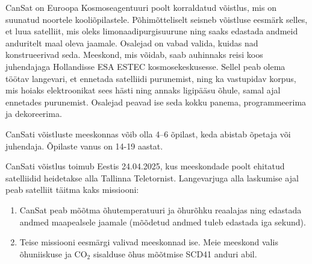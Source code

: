 CanSat on Euroopa Kosmoseagentuuri poolt korraldatud võistlus, mis on suunatud noortele kooliõpilastele. Põhimõtteliselt seisneb võistluse eesmärk selles, et luua satelliit, mis oleks limonaadipurgisuurune ning saaks edastada andmeid anduritelt maal oleva jaamale. Osalejad on vabad valida, kuidas nad konstrueerivad seda. Meeskond, mis võidab, saab auhinnaks reisi koos juhendajaga Hollandisse ESA ESTEC kosmosekeskusesse. Sellel peab olema töötav langevari, et ennetada satelliidi purunemist, ning ka vastupidav korpus, mis hoiaks elektroonikat sees hästi ning annaks ligipääsu õhule, samal ajal ennetades purunemist. Osalejad peavad ise seda kokku panema, programmeerima ja dekoreerima.

CanSati võistluste meeskonnas võib olla 4–6 õpilast, keda abistab õpetaja või juhendaja. Õpilaste vanus on 14-19 aastat.

CanSati võistlus toimub Eestis 24.04.2025, kus meeskondade poolt ehitatud satelliidid heidetakse alla Tallinna Teletornist. Langevarjuga alla laskumise ajal peab satelliit täitma kaks missiooni:
\begin{enumerate}
    \item CanSat peab mõõtma õhutemperatuuri ja õhurõhku reaalajas ning edastada andmed maapealsele jaamale (mõõdetud andmed tuleb edastada iga sekund).
    \item Teise missiooni eesmärgi valivad meeskonnad ise. Meie meeskond valis  
    õhuniiskuse ja CO$_2$ sisalduse õhus mõõtmise SCD41 anduri abil.
\end{enumerate}

